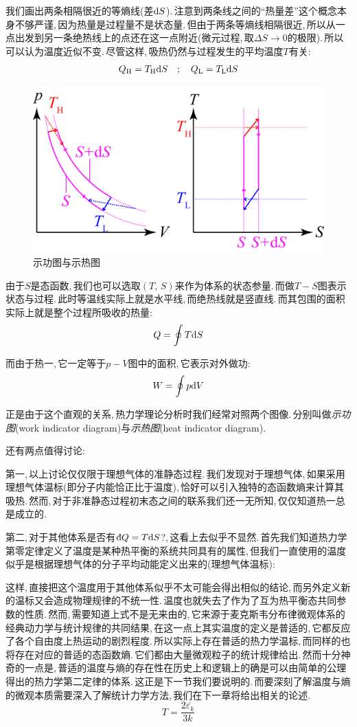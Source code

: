 我们画出两条相隔很近的等熵线(差$\textrm{d} S$).\,注意到两条线之间的``热量差''这个概念本身不够严谨,\,因为热量是过程量不是状态量.\,但由于两条等熵线相隔很近,\,所以从一点出发到另一条绝热线上的点还在这一点附近(微元过程,\,取$\Delta S\rightarrow 0$的极限).\,所以可以认为温度近似不变.\,尽管这样,\,吸热仍然与过程发生的平均温度$T$有关:
\[Q_{\rm H}=T_{\rm H}\textrm{d} S\quad;\quad Q_{\rm L}=T_{\rm L}\textrm{d} S\]

\begin{figure}[H]
\centering
\includegraphics[width=15cm]{image/5-2-12.png}
\caption{示功图与示热图}\label{fig5-2-12}
\end{figure}

由于$S$是态函数,\,我们也可以选取$(T,\,S)$来作为体系的状态参量.\,而做$T-S$图表示状态与过程.\,此时等温线实际上就是水平线,\,而绝热线就是竖直线.\,而其包围的面积实际上就是整个过程所吸收的热量:
\[Q=\oint T\textrm{d} S\]

而由于热一,\,它一定等于$p-V$图中的面积,\,它表示对外做功:
\[W=\oint p\textrm{d} V\]

正是由于这个直观的关系,\,热力学理论分析时我们经常对照两个图像.\,分别叫做\emph{示功图}(work indicator diagram)与\emph{示热图}(heat indicator diagram).

还有两点值得讨论:

第一,\,以上讨论仅仅限于理想气体的准静态过程.\,我们发现对于理想气体,\,如果采用理想气体温标(即分子内能恰正比于温度),\,恰好可以引入独特的态函数熵来计算其吸热.\,然而,\,对于非准静态过程初末态之间的联系我们还一无所知,\,仅仅知道热一总是成立的.

第二,\,对于其他体系是否有$\dbar Q=T\ud S$?,\,这看上去似乎不显然.\,首先我们知道热力学第零定律定义了温度是某种热平衡的系统共同具有的属性,\,但我们一直使用的温度似乎是根据理想气体的分子平均动能定义出来的(理想气体温标):


这样,\,直接把这个温度用于其他体系似乎不太可能会得出相似的结论,\,而另外定义新的温标又会造成物理规律的不统一性.\,温度也就失去了作为了互为热平衡态共同参数的性质.\,然而,\,需要知道上式不是无来由的,\,它来源于麦克斯韦分布律\ca 微观体系的经典动力学与统计规律的共同结果,\,在这一点上其实温度的定义是普适的,\,它都反应了各个自由度上热运动的剧烈程度.\,所以实际上存在普适的热力学温标,\,而同样的也将存在对应的普适的态函数熵.\,它们都由大量微观粒子的统计规律给出.\,然而十分神奇的一点是,\,普适的温度与熵的存在性在历史上和逻辑上的确是可以由简单的公理得出的热力学第二定律的体系.\,这正是下一节我们要说明的.\,而要深刻了解温度与熵的微观本质需要深入了解统计力学方法,\,我们在下一章将给出相关的论述.
\[T=\frac{2\overline{\varepsilon_k}}{3k}\]


